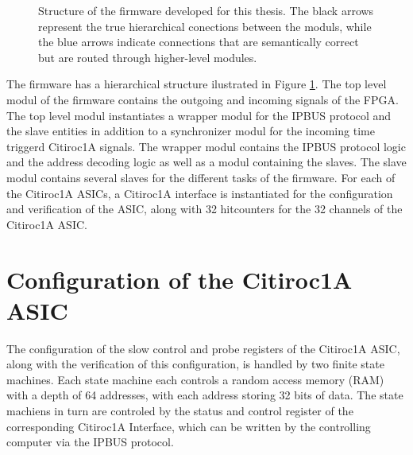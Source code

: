 \begin{figure}[H]
\begin{tikzpicture}[node distance=2cm]
        
    \end{tikzpicture}
    \caption{Structure of the firmware developed for this thesis. The black arrows represent the true hierarchical 
    conections between the moduls, while the blue arrows indicate connections that are semantically correct but are routed through higher-level modules.}
    \label{fig:Firmware_structure}
\end{figure}
The firmware has a hierarchical structure ilustrated in Figure \ref{fig:Firmware_structure}. 
\newline
The top level modul of the firmware contains the outgoing and incoming signals of the FPGA.
\newline
The top level modul instantiates a wrapper modul for the IPBUS protocol and the slave entities in addition to a synchronizer modul for the incoming time triggerd Citiroc1A signals. 
\newline
The wrapper modul contains the IPBUS protocol logic and the address decoding logic as well as a modul containing the slaves.
\newline
The slave modul contains several slaves for the different tasks of the firmware. For each of the Citiroc1A ASICs, a Citiroc1A interface is instantiated for the configuration and verification of the ASIC, along with
32 hitcounters for the 32 channels of the Citiroc1A ASIC. 



\section{Configuration of the Citiroc1A ASIC}

The configuration of the slow control and probe registers of the Citiroc1A ASIC,
 along with the verification of this configuration, is handled by two finite state machines.
 \newline
  Each state machine each controls a random access memory (RAM) with a depth of 64 addresses,
  with each address storing 32 bits of data.
 \newline
The state machiens in turn are controled by the status and control register of the corresponding Citiroc1A Interface, which can be written by the controlling computer via the IPBUS protocol.
